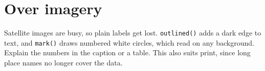 \section{Over imagery}
Satellite images are busy, so plain labels get lost. \texttt{outlined()} adds a dark edge to text, and \texttt{mark()} draws numbered white circles, which read on any background. Explain the numbers in the caption or a table. This also suits print, since long place names no longer cover the data.


